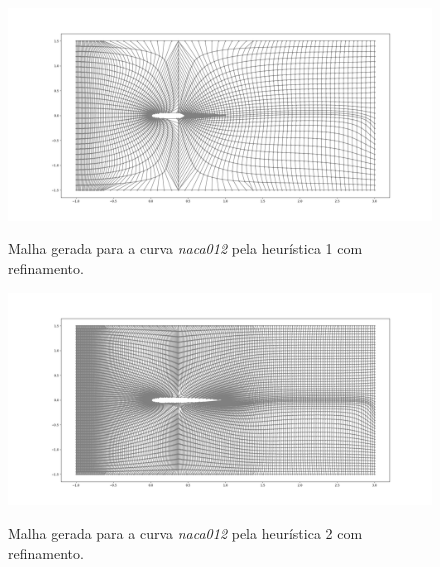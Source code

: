 \documentclass[a4paper]{article}
\begin{document}
\begin{figure}[H]
	\centering
	\includegraphics[width=1.0\textwidth]{naca_h1_refined.png}
	\label{fig:naca_h1_refined} 
	\caption[caption]{Malha gerada para a curva \textit{naca012 } pela heurística 1 com refinamento.}
\end{figure}

\begin{figure}[H]
	\centering
	\includegraphics[width=1.0\textwidth]{naca_h2_refined.png}
	\label{fig:naca_h2_refined} 
	\caption[caption]{Malha gerada para a curva \textit{naca012 } pela heurística 2 com refinamento.}
\end{figure}
\end{document}
